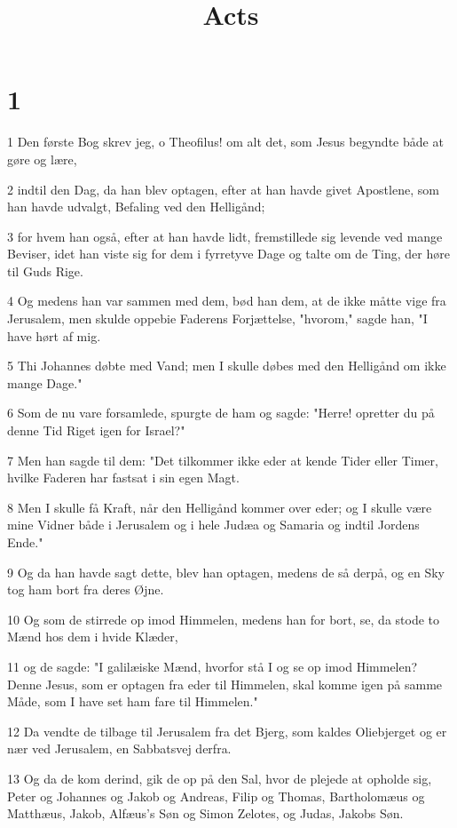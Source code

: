 

\title{Acts}


\chapter{1}

\par 1 Den første Bog skrev jeg, o Theofilus! om alt det, som Jesus begyndte både at gøre og lære,
\par 2 indtil den Dag, da han blev optagen, efter at han havde givet Apostlene, som han havde udvalgt, Befaling ved den Helligånd;
\par 3 for hvem han også, efter at han havde lidt, fremstillede sig levende ved mange Beviser, idet han viste sig for dem i fyrretyve Dage og talte om de Ting, der høre til Guds Rige.
\par 4 Og medens han var sammen med dem, bød han dem, at de ikke måtte vige fra Jerusalem, men skulde oppebie Faderens Forjættelse, "hvorom," sagde han, "I have hørt af mig.
\par 5 Thi Johannes døbte med Vand; men I skulle døbes med den Helligånd om ikke mange Dage."
\par 6 Som de nu vare forsamlede, spurgte de ham og sagde: "Herre! opretter du på denne Tid Riget igen for Israel?"
\par 7 Men han sagde til dem: "Det tilkommer ikke eder at kende Tider eller Timer, hvilke Faderen har fastsat i sin egen Magt.
\par 8 Men I skulle få Kraft, når den Helligånd kommer over eder; og I skulle være mine Vidner både i Jerusalem og i hele Judæa og Samaria og indtil Jordens Ende."
\par 9 Og da han havde sagt dette, blev han optagen, medens de så derpå, og en Sky tog ham bort fra deres Øjne.
\par 10 Og som de stirrede op imod Himmelen, medens han for bort, se, da stode to Mænd hos dem i hvide Klæder,
\par 11 og de sagde: "I galilæiske Mænd, hvorfor stå I og se op imod Himmelen? Denne Jesus, som er optagen fra eder til Himmelen, skal komme igen på samme Måde, som I have set ham fare til Himmelen."
\par 12 Da vendte de tilbage til Jerusalem fra det Bjerg, som kaldes Oliebjerget og er nær ved Jerusalem, en Sabbatsvej derfra.
\par 13 Og da de kom derind, gik de op på den Sal, hvor de plejede at opholde sig, Peter og Johannes og Jakob og Andreas, Filip og Thomas, Bartholomæus og Matthæus, Jakob, Alfæus's Søn og Simon Zelotes, og Judas, Jakobs Søn.

